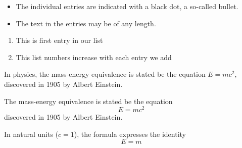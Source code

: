 \documentclass[12pt, a4paper]{article}
\begin{document}
\begin{itemize}
	\item The individual entries are indicated with a black dot, a so-called bullet.
	\item The text in the entries may be of any length.
\end{itemize}

\begin{enumerate}
	\item This is first entry in our list
	\item This list numbers increase with each entry we add
\end{enumerate}

In physics, the mass-energy equivalence is stated be the equation
$E=mc^2$, discovered in 1905 by Albert Einstein.



The mass-energy equivalence is stated be the equation
\[ E=mc^2 \]
discovered in 1905 by Albert Einstein.

In natural units ($c = 1$), the formula expresses the identity
\begin{equation}
E=m
\end{equation}
\end{document}

